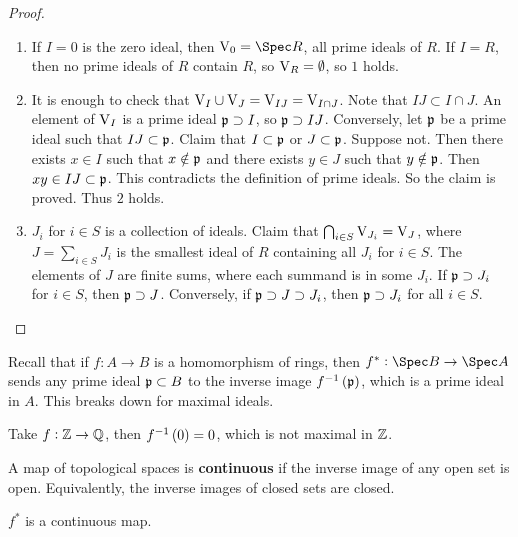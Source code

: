 \begin{proof}
\hfill
\begin{enumerate}
\item If $ I = 0 $ is the zero ideal, then $ \V_0 = \Spec R $, all prime ideals of $ R $. If $ I = R $, then no prime ideals of $ R $ contain $ R $, so $ \mathrm{V}_R = \emptyset $, so $ 1 $ holds.
\item It is enough to check that $ \mathrm{V}_I \cup \mathrm{V}_J = \mathrm{V}_{IJ} = \mathrm{V}_{I \cap J} $. Note that $ IJ \subset I \cap J $. An element of $ \mathrm{V}_I $ is a prime ideal $ \mathfrak{p} \supset I $, so $ \mathfrak{p} \supset IJ $. Conversely, let $ \mathfrak{p} $ be a prime ideal such that $ IJ \subset \mathfrak{p} $. Claim that $ I \subset \mathfrak{p} $ or $ J \subset \mathfrak{p} $. Suppose not. Then there exists $ x \in I $ such that $ x \notin \mathfrak{p} $ and there exists $ y \in J $ such that $ y \notin \mathfrak{p} $. Then $ xy \in IJ \subset \mathfrak{p} $. This contradicts the definition of prime ideals. So the claim is proved. Thus $ 2 $ holds.
\item $ J_i $ for $ i \in S $ is a collection of ideals. Claim that $ \bigcap_{i \in S} \mathrm{V}_{J_i} = \mathrm{V}_J $, where $ J = \sum_{i \in S} J_i $ is the smallest ideal of $ R $ containing all $ J_i $ for $ i \in S $. The elements of $ J $ are finite sums, where each summand is in some $ J_i $. If $ \mathfrak{p} \supset J_i $ for $ i \in S $, then $ \mathfrak{p} \supset J $. Conversely, if $ \mathfrak{p} \supset J \supset J_i $, then $ \mathfrak{p} \supset J_i $ for all $ i \in S $.
\end{enumerate}
\end{proof}

Recall that if $ f : A \to B $ is a homomorphism of rings, then $ f^* : \Spec B \to \Spec A $ sends any prime ideal $ \mathfrak{p} \subset B $ to the inverse image $ f^{-1}\br{\ppp} $, which is a prime ideal in $ A $. This breaks down for maximal ideals.

\begin{example*}
Take $ f : \mathbb{Z} \to \mathbb{Q} $, then $ f^{-1}\br{0} = 0 $, which is not maximal in $ \mathbb{Z} $.
\end{example*}

A map of topological spaces is \textbf{continuous} if the inverse image of any open set is open. Equivalently, the inverse images of closed sets are closed.

\begin{proposition}
$ f^* $ is a continuous map.
\end{proposition}

